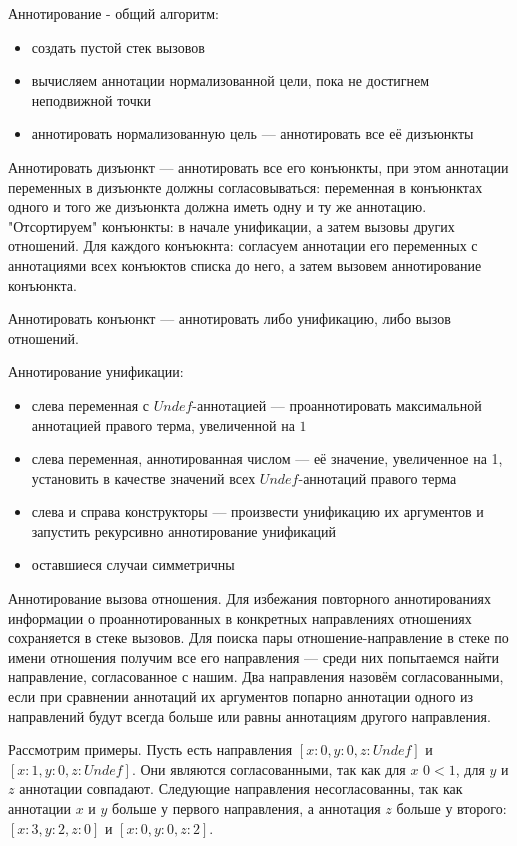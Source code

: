 \documentclass[conference,american,russian]{IEEEtran}
\begin{document}
Аннотирование - общий алгоритм:
\begin{itemize}
    \item создать пустой стек вызовов
    \item вычисляем аннотации нормализованной цели, пока не достигнем неподвижной точки
    \item аннотировать нормализованную цель --- аннотировать все её дизъюнкты
\end{itemize}

Аннотировать дизъюнкт --- аннотировать все его конъюнкты, при этом аннотации переменных в дизъюнкте должны согласовываться: переменная в конъюнктах одного и того же дизъюнкта должна иметь одну и ту же аннотацию.
"Отсортируем" конъюнкты: в начале унификации, а затем вызовы других отношений.
Для каждого конъюкнта: согласуем аннотации его переменных с аннотациями всех конъюктов списка до него, а затем вызовем аннотирование конъюнкта.

Аннотировать конъюнкт --- аннотировать либо унификацию, либо вызов отношений.

Аннотирование унификации:
\begin{itemize}
    \item слева переменная с $Undef$-аннотацией --- проаннотировать максимальной аннотацией правого терма, увеличенной на $1$
    \item слева переменная, аннотированная числом --- её значение, увеличенное на 1, установить в качестве значений всех $Undef$-аннотаций правого терма
    \item слева и справа конструкторы --- произвести унификацию их аргументов и запустить рекурсивно аннотирование унификаций
    \item оставшиеся случаи симметричны
\end{itemize}

Аннотирование вызова отношения.
Для избежания повторного аннотированиях информации о проаннотированных в конкретных направлениях отношениях сохраняется в стеке вызовов.
Для поиска пары отношение-направление в стеке по имени отношения получим все его направления --- среди них попытаемся найти направление, согласованное с нашим.
Два направления назовём согласованными, если при сравнении аннотаций их аргументов попарно аннотации одного из направлений будут всегда больше или равны аннотациям другого направления.

Рассмотрим примеры.
Пусть есть направления $[x: 0, y: 0, z: Undef]$ и $[x: 1, y: 0, z: Undef]$.
Они являются согласованными, так как для $x$ $0 < 1$, для $y$ и $z$ аннотации совпадают.
Следующие направления несогласованны, так как аннотации $x$ и $y$ больше у первого направления, а аннотация $z$ больше у второго: $[x: 3, y: 2, z: 0]$ и $[x: 0, y: 0, z: 2]$.
\end{document}
